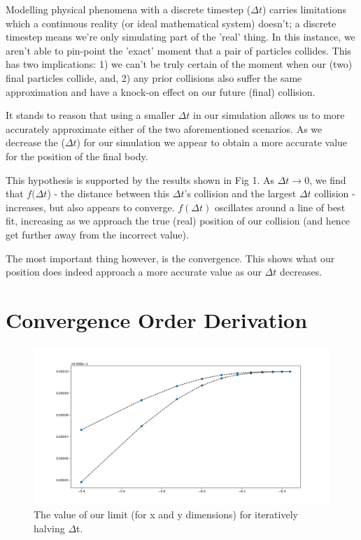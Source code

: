 \documentclass[twoside,11pt]{article}
\begin{document}
Modelling physical phenomena with a discrete timestep ($\Delta t$) carries limitations which a continuous reality (or ideal mathematical system) doesn't; a discrete timestep means we're only simulating part of the 'real' thing. In this instance, we aren't able to pin-point the 'exact' moment that a pair of particles collides. This has two implications: 1) we can't be truly certain of the moment when our (two) final particles collide, and, 2) any prior collisions also suffer the same approximation and have a knock-on effect on our future (final) collision.

It stands to reason that using a smaller $\Delta t$ in our simulation allows us to more accurately approximate either of the two aforementioned scenarios. As we decrease the ($\Delta t$) for our simulation we appear to obtain a more accurate value for the position of the final body.

This hypothesis is supported by the results shown in Fig 1. As $\Delta t \rightarrow 0$, we find that $f(\Delta t$) - the distance between this $\Delta t$'s collision and the largest $\Delta t$ collision - increases, but also appears to converge. $f(\Delta t)$ oscillates around a line of best fit, increasing as we approach the true (real) position of our collision (and hence get further away from the incorrect value).

The most important thing however, is the convergence. This shows what our position does indeed approach a more accurate value as our $\Delta t$ decreases.

\section*{Convergence Order Derivation}

\begin{figure}
  \includegraphics[width=\linewidth]{convergence.png}
  \caption{The value of our limit (for x and y dimensions) for iteratively halving $\Delta$t.}
  \label{Fig 2:}
\end{figure}
\end{document}
